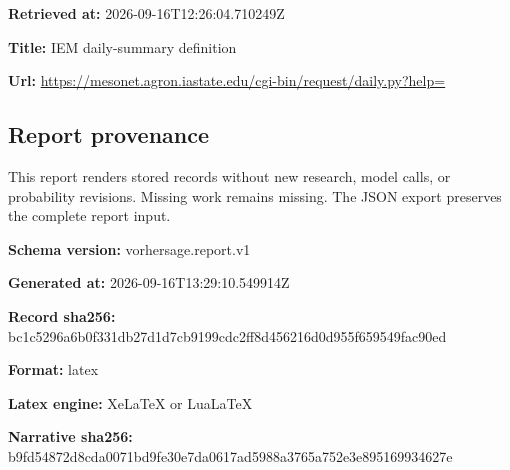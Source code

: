 \documentclass[11pt]{article}
\begin{document}
\par\noindent\textbf{Retrieved at:} 2026-09-16T12:26:04.710249Z

\par\noindent\textbf{Title:} IEM daily-summary definition

\par\noindent\textbf{Url:} \href{https://mesonet.agron.iastate.edu/cgi-bin/request/daily.py?help=}{https://meso\hspace{0pt}net.agron.ia\hspace{0pt}state.edu/cg\hspace{0pt}i-bin/reques\hspace{0pt}t/daily.py?h\hspace{0pt}elp=}

\subsection*{\textcolor{epdarkgreen}{Report provenance}}
This report renders stored records without new research, model calls, or probability revisions. Missing work remains missing. The JSON export preserves the complete report input.


\par\noindent\textbf{Schema version:} vorhersage.report.v1

\par\noindent\textbf{Generated at:} 2026-09-16T13:29:10.549914Z

\par\noindent\textbf{Record sha256:} bc1c5296a6b0\hspace{0pt}f331db27d1d7\hspace{0pt}cb9199cdc2ff\hspace{0pt}8d456216d0d9\hspace{0pt}55f659549fac\hspace{0pt}90ed

\par\noindent\textbf{Format:} latex

\par\noindent\textbf{Latex engine:} XeLaTeX or LuaLaTeX

\par\noindent\textbf{Narrative sha256:} b9fd54872d8c\hspace{0pt}da0071bd9fe3\hspace{0pt}0e7da0617ad5\hspace{0pt}988a3765a752\hspace{0pt}e3e895169934\hspace{0pt}627e
\end{document}
